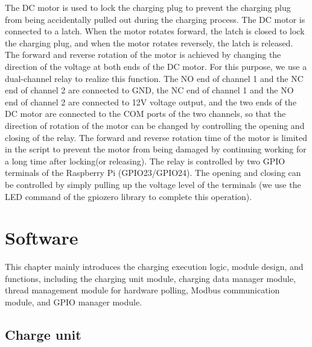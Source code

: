 \documentclass[
english,
ruledheaders=section,%
class=report,%
thesis={type=Report},%
accentcolor=9c,%
custommargins=true,%
marginpar=false,%
parskip=half-,%
fontsize=11pt,%
logofile={img/tuda_logo.pdf}, %
]{tudapub}
\begin{document}
    The DC motor is used to lock the charging plug to prevent the charging plug from being accidentally pulled out during the charging process. The DC motor is connected to a latch. When the motor rotates forward, the latch is closed to lock the charging plug, and when the motor rotates reversely, the latch is released. The forward and reverse rotation of the motor is achieved by changing the direction of the voltage at both ends of the DC motor. For this purpose, we use a dual-channel relay to realize this function. The NO end of channel 1 and the NC end of channel 2 are connected to GND, the NC end of channel 1 and the NO end of channel 2 are connected to 12V voltage output, and the two ends of the DC motor are connected to the COM ports of the two channels, so that the direction of rotation of the motor can be changed by controlling the opening and closing of the relay. The forward and reverse rotation time of the motor is limited in the script to prevent the motor from being damaged by continuing working for a long time after locking(or releasing). The relay is controlled by two GPIO terminals of the Raspberry Pi (GPIO23/GPIO24). The opening and closing can be controlled by simply pulling up the voltage level of the terminals (we use the LED command of the gpiozero library to complete this operation).
    \section{Software}
    \label{sec:CPSoftware}

    This chapter mainly introduces the charging execution logic, module design, and functions, including the charging unit module, charging data manager module, thread management module for hardware polling, Modbus communication module, and GPIO manager module.

    \subsection{Charge unit}
    \label{sec:chargeUnit}
\end{document}

